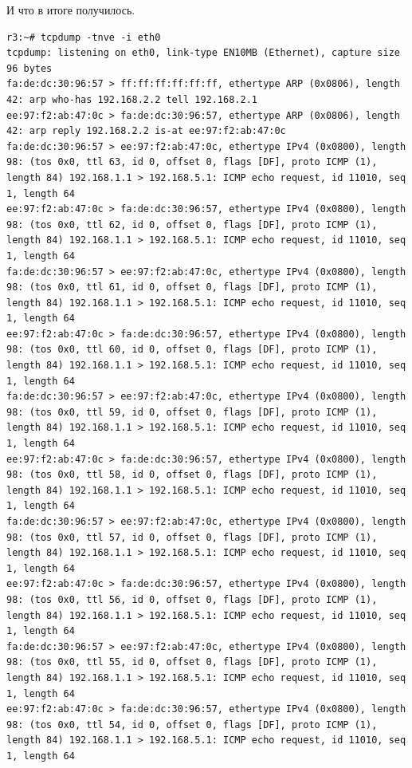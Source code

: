 \documentclass[a4paper,12pt]{article}
\begin{document}
И что в итоге получилось.

\begin{Verbatim}
r3:~# tcpdump -tnve -i eth0
tcpdump: listening on eth0, link-type EN10MB (Ethernet), capture size 96 bytes
fa:de:dc:30:96:57 > ff:ff:ff:ff:ff:ff, ethertype ARP (0x0806), length 42: arp who-has 192.168.2.2 tell 192.168.2.1
ee:97:f2:ab:47:0c > fa:de:dc:30:96:57, ethertype ARP (0x0806), length 42: arp reply 192.168.2.2 is-at ee:97:f2:ab:47:0c
fa:de:dc:30:96:57 > ee:97:f2:ab:47:0c, ethertype IPv4 (0x0800), length 98: (tos 0x0, ttl 63, id 0, offset 0, flags [DF], proto ICMP (1), length 84) 192.168.1.1 > 192.168.5.1: ICMP echo request, id 11010, seq 1, length 64
ee:97:f2:ab:47:0c > fa:de:dc:30:96:57, ethertype IPv4 (0x0800), length 98: (tos 0x0, ttl 62, id 0, offset 0, flags [DF], proto ICMP (1), length 84) 192.168.1.1 > 192.168.5.1: ICMP echo request, id 11010, seq 1, length 64
fa:de:dc:30:96:57 > ee:97:f2:ab:47:0c, ethertype IPv4 (0x0800), length 98: (tos 0x0, ttl 61, id 0, offset 0, flags [DF], proto ICMP (1), length 84) 192.168.1.1 > 192.168.5.1: ICMP echo request, id 11010, seq 1, length 64
ee:97:f2:ab:47:0c > fa:de:dc:30:96:57, ethertype IPv4 (0x0800), length 98: (tos 0x0, ttl 60, id 0, offset 0, flags [DF], proto ICMP (1), length 84) 192.168.1.1 > 192.168.5.1: ICMP echo request, id 11010, seq 1, length 64
fa:de:dc:30:96:57 > ee:97:f2:ab:47:0c, ethertype IPv4 (0x0800), length 98: (tos 0x0, ttl 59, id 0, offset 0, flags [DF], proto ICMP (1), length 84) 192.168.1.1 > 192.168.5.1: ICMP echo request, id 11010, seq 1, length 64
ee:97:f2:ab:47:0c > fa:de:dc:30:96:57, ethertype IPv4 (0x0800), length 98: (tos 0x0, ttl 58, id 0, offset 0, flags [DF], proto ICMP (1), length 84) 192.168.1.1 > 192.168.5.1: ICMP echo request, id 11010, seq 1, length 64
fa:de:dc:30:96:57 > ee:97:f2:ab:47:0c, ethertype IPv4 (0x0800), length 98: (tos 0x0, ttl 57, id 0, offset 0, flags [DF], proto ICMP (1), length 84) 192.168.1.1 > 192.168.5.1: ICMP echo request, id 11010, seq 1, length 64
ee:97:f2:ab:47:0c > fa:de:dc:30:96:57, ethertype IPv4 (0x0800), length 98: (tos 0x0, ttl 56, id 0, offset 0, flags [DF], proto ICMP (1), length 84) 192.168.1.1 > 192.168.5.1: ICMP echo request, id 11010, seq 1, length 64
fa:de:dc:30:96:57 > ee:97:f2:ab:47:0c, ethertype IPv4 (0x0800), length 98: (tos 0x0, ttl 55, id 0, offset 0, flags [DF], proto ICMP (1), length 84) 192.168.1.1 > 192.168.5.1: ICMP echo request, id 11010, seq 1, length 64
ee:97:f2:ab:47:0c > fa:de:dc:30:96:57, ethertype IPv4 (0x0800), length 98: (tos 0x0, ttl 54, id 0, offset 0, flags [DF], proto ICMP (1), length 84) 192.168.1.1 > 192.168.5.1: ICMP echo request, id 11010, seq 1, length 64

\end{Verbatim}
\end{document}
